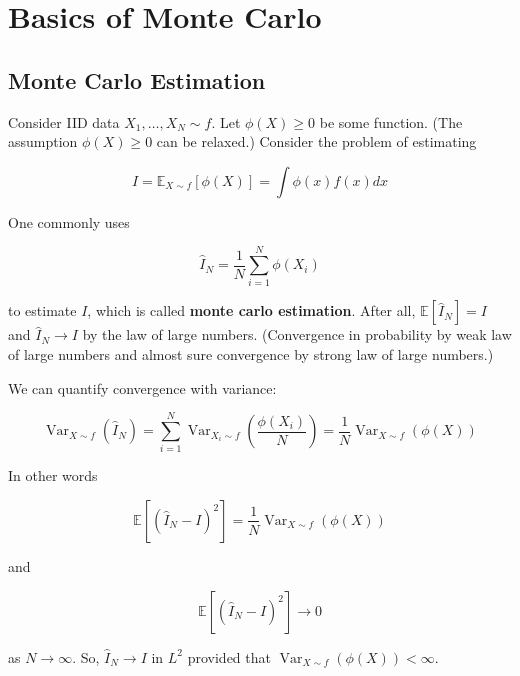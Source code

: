 \documentclass{report}
\begin{document}
\chapter{Basics of Monte Carlo}

\section{Monte Carlo Estimation}

\begin{definition}
    Consider IID data $X_{1}, \ldots, X_{N} \sim f$.
    Let $\phi(X) \geq 0$ be some function. (The assumption $\phi(X) \geq 0$ can be relaxed.)
    Consider the problem of estimating

    $$
    I=\mathbb{E}_{X \sim f}[\phi(X)]=\int \phi(x) f(x) d x
    $$

    One commonly uses

    $$
    \hat{I}_{N}=\frac{1}{N} \sum_{i=1}^{N} \phi\left(X_{i}\right)
    $$

    to estimate $I$, which is called \textbf{monte carlo estimation}.
    After all, $\mathbb{E}\left[\hat{I}_{N}\right]=I$ and $\hat{I}_{N} \rightarrow I$ by the law of large numbers.
    (Convergence in probability by weak law of large numbers and almost sure convergence by strong law of large numbers.)
\end{definition}

\begin{concept}
    We can quantify convergence with variance:

    $$
    \operatorname{Var}_{X \sim f}\left(\hat{I}_{N}\right)=\sum_{i=1}^{N} \operatorname{Var}_{X_{i} \sim f}\left(\frac{\phi\left(X_{i}\right)}{N}\right)=\frac{1}{N} \operatorname{Var}_{X \sim f}(\phi(X))
    $$

    In other words

    $$
    \mathbb{E}\left[\left(\hat{I}_{N}-I\right)^{2}\right]=\frac{1}{N} \operatorname{Var}_{X \sim f}(\phi(X))
    $$

    and

    $$
    \mathbb{E}\left[\left(\hat{I}_{N}-I\right)^{2}\right] \rightarrow 0
    $$

    as $N \rightarrow \infty$.
    So, $\hat{I}_{N} \rightarrow I$ in $L^2$ provided that $\operatorname{Var}_{X \sim f}(\phi(X)) < \infty$.
\end{concept}
\end{document}

